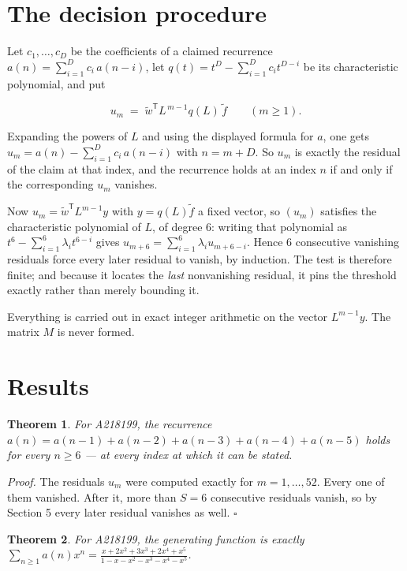 \documentclass[11pt]{article}
\newtheorem{theorem}{Theorem}
\theoremstyle{definition}
\begin{document}
\section{The decision procedure}

Let $c_1,\dots,c_D$ be the coefficients of a claimed recurrence $a(n) = \sum_{i=1}^{D} c_i\,a(n-i)$, let $q(t) = t^{D} - \sum_{i=1}^{D} c_i t^{D-i}$ be its characteristic polynomial, and put

\[u_m \;=\; \tilde w^{\mathsf T} L^{\,m-1} q(L)\,\tilde f \qquad (m \ge 1).\]

Expanding the powers of $L$ and using the displayed formula for $a$, one gets $u_m = a(n) - \sum_{i=1}^{D} c_i\,a(n-i)$ with $n = m + D$. So $u_m$ is exactly the residual of the claim at that index, and the recurrence holds at an index $n$ if and only if the corresponding $u_m$ vanishes.

Now $u_m = \tilde w^{\mathsf T} L^{m-1} y$ with $y = q(L)\tilde f$ a fixed vector, so $(u_m)$ satisfies the characteristic polynomial of $L$, of degree $6$: writing that polynomial as $t^{6} - \sum_{i=1}^{6} \lambda_i t^{6-i}$ gives $u_{m+6} = \sum_{i=1}^{6} \lambda_i u_{m+6-i}$. Hence $6$ consecutive vanishing residuals force every later residual to vanish, by induction. The test is therefore finite; and because it locates the {\itshape last} nonvanishing residual, it pins the threshold exactly rather than merely bounding it.

Everything is carried out in exact integer arithmetic on the vector $L^{m-1}y$. The matrix $M$ is never formed.

\section{Results}

\begin{theorem} For A218199, the recurrence $a(n) = a(n-1) + a(n-2) + a(n-3) + a(n-4) + a(n-5)$ holds for every $n \ge 6$ --- at every index at which it can be stated.\end{theorem}

{\itshape Proof.} The residuals $u_m$ were computed exactly for $m = 1,\dots,52$. Every one of them vanished. After it, more than $S = 6$ consecutive residuals vanish, so by Section 5 every later residual vanishes as well. $\square$

\begin{theorem} For A218199, the generating function is exactly $\sum_{n\ge 1} a(n)x^n = \frac{x + 2x^{2} + 3x^{3} + 2x^{4} + x^{5}}{1 - x - x^{2} - x^{3} - x^{4} - x^{5}}$.\end{theorem}
\end{document}
